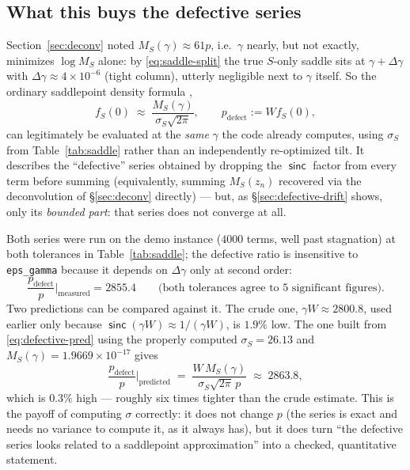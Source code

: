 \documentclass[11pt]{article}
\newcommand{\sinck}{\operatorname{\mathsf{sinc}}}
\begin{document}
\subsection{What this buys the defective series}
\label{sec:defective}

Section~\ref{sec:deconv} noted $M_S(\gamma)\approx61p$, i.e.\ $\gamma$ nearly, but not exactly,
minimizes $\log M_S$ alone: by \eqref{eq:saddle-split} the true $S$-only saddle sits at
$\gamma+\Delta\gamma$ with $\Delta\gamma\approx4\times10^{-6}$ (tight column), utterly negligible
next to $\gamma$ itself. So the ordinary saddlepoint density formula \citep{daniels1954},
\begin{equation}
  \label{eq:defective-pred}
  f_S(0)\;\approx\;\frac{M_S(\gamma)}{\sigma_S\sqrt{2\pi}},\qquad p_{\mathrm{defect}}:=W f_S(0),
\end{equation}
can legitimately be evaluated at the \emph{same} $\gamma$ the code already computes, using
$\sigma_S$ from Table~\ref{tab:saddle} rather than an independently re-optimized tilt. It describes
the ``defective'' series obtained by dropping the $\sinck$ factor from every term before summing
(equivalently, summing $M_S(z_n)$ recovered via the deconvolution of \S\ref{sec:deconv} directly) ---
but, as \S\ref{sec:defective-drift} shows, only its \emph{bounded part}: that series does not
converge at all.

Both series were run on the demo instance ($4000$ terms, well past stagnation) at both
tolerances in Table~\ref{tab:saddle}; the defective ratio is insensitive to \texttt{eps\_gamma}
because it depends on $\Delta\gamma$ only at second order:
\[
  \frac{p_{\mathrm{defect}}}{p}\Big|_{\text{measured}} = 2855.4 \qquad\text{(both tolerances agree to 5 significant figures).}
\]
Two predictions can be compared against it. The crude one, $\gamma W\approx2800.8$, used earlier only
because $\sinck(\gamma W)\approx1/(\gamma W)$, is $1.9\%$ low. The one built from
\eqref{eq:defective-pred} using the properly computed $\sigma_S=26.13$ and $M_S(\gamma)=1.9669\times
10^{-17}$ gives
\[
  \frac{p_{\mathrm{defect}}}{p}\Big|_{\text{predicted}}\;=\;\frac{W\,M_S(\gamma)}{\sigma_S\sqrt{2\pi}\,p}\;\approx\;2863.8,
\]
which is $0.3\%$ high — roughly six times tighter than the crude estimate. This is the payoff of
computing $\sigma$ correctly: it does not change $p$ (the series is exact and needs no variance to
compute it, as it always has), but it does turn ``the defective series looks related to a saddlepoint
approximation'' into a checked, quantitative statement.
\end{document}
